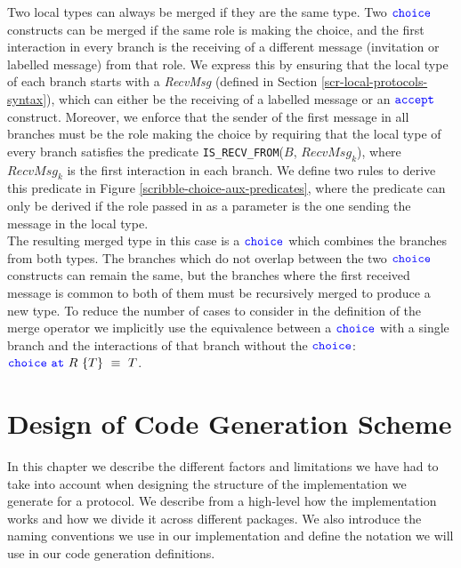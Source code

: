 \documentclass[12pt,twoside]{report}
\begin{document}
Two local types can always be merged if they are the same type. Two ${\color{blue}\mathtt{choice}}$ constructs can be merged if the same role is making the choice, and the first interaction in every branch is the receiving of a different message (invitation or labelled message) from that role. We express this by ensuring that the local type of each branch starts with a \textit{RecvMsg} (defined in Section \ref{scr-local-protocols-syntax}), which can either be the receiving of a labelled message or an ${\color{blue}\mathtt{accept}}$ construct. Moreover, we enforce that the sender of the first message in all branches must be the role making the choice by requiring that the local type of every branch satisfies the predicate \texttt{IS\_RECV\_FROM}($\mathit{B}$, $\mathit{RecvMsg_k}$), where $\mathit{RecvMsg_k}$ is the first interaction in each branch. We define two rules to derive this predicate in Figure \ref{scribble-choice-aux-predicates}, where the predicate can only be derived if the role passed in as a parameter is the one sending the message in the local type.\\

The resulting merged type in this case is a ${\color{blue}\mathtt{choice}}$ which combines the branches from both types. The branches which do not overlap between the two ${\color{blue}\mathtt{choice}}$ constructs can remain the same, but the branches where the first received message is common to both of them must be recursively merged to produce a new type. To reduce the number of cases to consider in the definition of the merge operator we implicitly use the equivalence between a ${\color{blue}\mathtt{choice}}$ with a single branch and the interactions of that branch without the ${\color{blue}\mathtt{choice}}$: ${\color{blue}\mathtt{choice}}\ {\color{blue}\mathtt{at}}\ R\ \{T\}\ \equiv\ T$.\\
 
\chapter{Design of Code Generation Scheme}\label{codegen-scheme-design}
In this chapter we describe the different factors and limitations we have had to take into account when designing the structure of the implementation we generate for a protocol. We describe from a high-level how the implementation works and how we divide it across different packages. We also introduce the naming conventions we use in our implementation and define the notation we will use in our code generation definitions.

\end{document}
